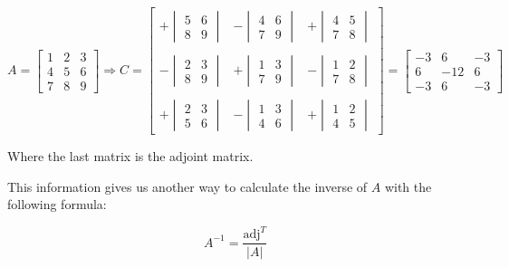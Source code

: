 \begin{itemize}
    $
    A = \begin{bmatrix}
        1 & 2 & 3 \\
        4 & 5 & 6 \\
        7 & 8 & 9
    \end{bmatrix}
    \Rightarrow 
    C = 
    \begin{bmatrix}
        + \begin{vmatrix}
            5 & 6 \\
            8 & 9
        \end{vmatrix} & 
        - \begin{vmatrix}
            4 & 6 \\
            7 & 9 
        \end{vmatrix} & 
        + \begin{vmatrix}
            4 & 5 \\
            7 & 8
        \end{vmatrix} \\ \\
        - \begin{vmatrix}
            2 & 3 \\
            8 & 9 
        \end{vmatrix} &
        + \begin{vmatrix}
            1 & 3 \\
            7 & 9
        \end{vmatrix} & 
        - \begin{vmatrix}
            1 & 2 \\
            7 & 8
        \end{vmatrix} \\ \\ 
        + \begin{vmatrix}
            2 & 3 \\
            5 & 6
        \end{vmatrix} & 
        - \begin{vmatrix}
            1 & 3 \\
            4 & 6
        \end{vmatrix} & 
        + \begin{vmatrix}
            1 & 2 \\
            4 & 5
        \end{vmatrix}
    \end{bmatrix}
    = 
    \begin{bmatrix}
        -3 & 6 & -3 \\
        6 & -12 & 6 \\
        -3 & 6 & -3
    \end{bmatrix}
    $

    Where the last matrix is the adjoint matrix. 
    
    This information gives us another way to calculate the inverse of $A$ with the following formula: 

    \begin{equation*}
        A^{-1} = \frac{\text{adj}^T}{|A|}
    \end{equation*}

\end{itemize}



